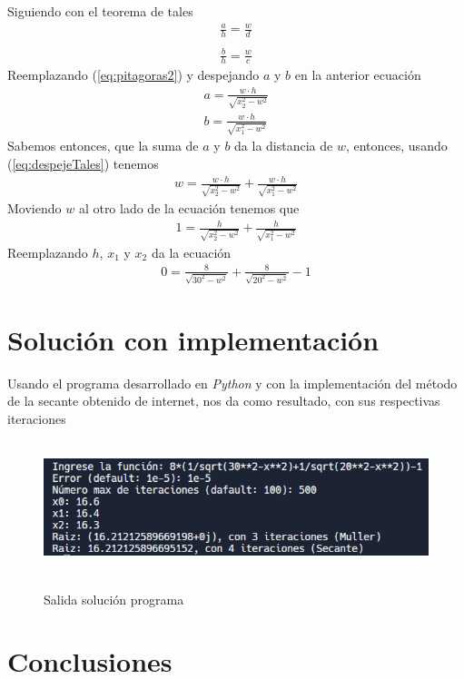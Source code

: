 \documentclass[ceqn,10pt]{SelfArx}
\begin{document}
Siguiendo con el teorema de tales
\begin{equation} \label{eq:tales}
\begin{aligned}
	\frac{a}{h} = \frac{w}{d}\\
	\\
	\frac{b}{h} = \frac{w}{c}
\end{aligned}
\end{equation}
Reemplazando (\ref{eq:pitagoras2}) y despejando $a$ y $b$ en la anterior ecuación
\begin{equation} \label{eq:despejeTales}
\begin{aligned}
	a = \frac{w \cdot h}{\sqrt{x_{2}^2-w^2}}\\
	b = \frac{w \cdot h}{\sqrt{x_{1}^2-w^2}}
\end{aligned}
\end{equation}
Sabemos entonces, que la suma de $a$ y $b$ da la distancia de $w$, entonces,
usando (\ref{eq:despejeTales}) tenemos
\begin{equation} \label{eq:obtenerW}
\begin{aligned}
	w = \frac{w \cdot h}{\sqrt{x_{2}^2-w^2}} + \frac{w \cdot h}{\sqrt{x_{1}^2-w^2}}
\end{aligned}
\end{equation}
Moviendo $w$ al otro lado de la ecuación tenemos que
\begin{equation} \label{eq:ecuacionW}
\begin{aligned}
	1 = \frac{h}{\sqrt{x_{2}^2-w^2}} + \frac{h}{\sqrt{x_{1}^2-w^2}}
\end{aligned}
\end{equation}
Reemplazando $h$, $x_{1}$ y $x_{2}$ da la ecuación
\begin{equation} \label{eq:despejeW}
\begin{aligned}
	0 = \frac{8}{\sqrt{30^2-w^2}} + \frac{8}{\sqrt{20^2-w^2}}-1
\end{aligned}
\end{equation}
\section{Solución con implementación}
Usando el programa desarrollado en \emph{Python} y con la 
implementación del método de la secante obtenido de internet, nos 
da como resultado, con sus respectivas iteraciones\\\
\begin{figure}[ht]\centering
	\includegraphics[scale=0.4]{solucionPython.png}\\\
	\caption{Salida solución programa}
	\label{fig:fotoPython}
\end{figure}

\section{Conclusiones}



\end{document}
